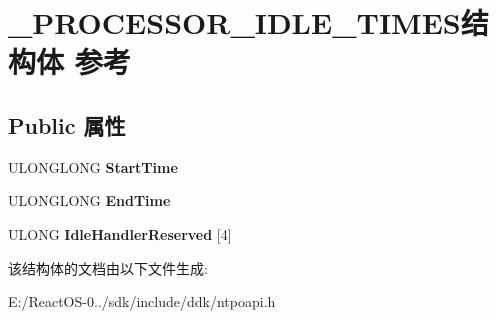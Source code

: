 \hypertarget{struct___p_r_o_c_e_s_s_o_r___i_d_l_e___t_i_m_e_s}{}\section{\+\_\+\+P\+R\+O\+C\+E\+S\+S\+O\+R\+\_\+\+I\+D\+L\+E\+\_\+\+T\+I\+M\+E\+S结构体 参考}
\label{struct___p_r_o_c_e_s_s_o_r___i_d_l_e___t_i_m_e_s}
\subsection*{Public 属性}
\begin{DoxyCompactItemize}
\item 
\mbox{\label{struct___p_r_o_c_e_s_s_o_r___i_d_l_e___t_i_m_e_s_a3734d96e447bad7c416ef39d94e28d94}} 
U\+L\+O\+N\+G\+L\+O\+NG {\bfseries Start\+Time}
\item 
\mbox{\label{struct___p_r_o_c_e_s_s_o_r___i_d_l_e___t_i_m_e_s_a881596d51edabdd58e3124ffed1621b4}} 
U\+L\+O\+N\+G\+L\+O\+NG {\bfseries End\+Time}
\item 
\mbox{\label{struct___p_r_o_c_e_s_s_o_r___i_d_l_e___t_i_m_e_s_aa260c94d04bb56c5099d6069b5ad56f9}} 
U\+L\+O\+NG {\bfseries Idle\+Handler\+Reserved} \mbox{[}4\mbox{]}
\end{DoxyCompactItemize}


该结构体的文档由以下文件生成\+:\begin{DoxyCompactItemize}
\item 
E\+:/\+React\+O\+S-\/0../sdk/include/ddk/ntpoapi.\+h\end{DoxyCompactItemize}
